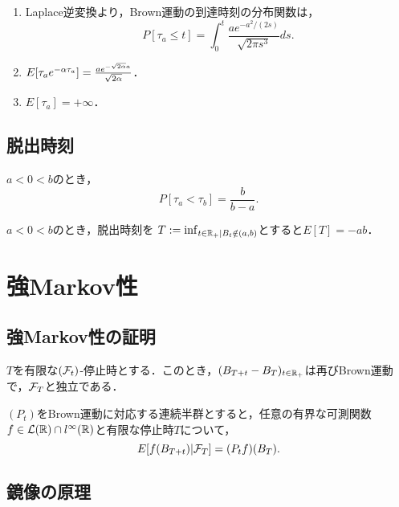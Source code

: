 \documentclass[uplatex,dvipdfmx]{jsreport}
\begin{document}
\begin{corollary}\mbox{}
    \begin{enumerate}
        \item Laplace逆変換より，Brown運動の到達時刻の分布関数は，
        \[P[\tau_a\le t]=\int^t_0\frac{ae^{-a^2/(2s)}}{\sqrt{2\pi s^3}}ds.\]
        \item $E[\tau_ae^{-\alpha\tau_a}]=\frac{ae^{-\sqrt{2\alpha}a}}{\sqrt{2\alpha}}$．
        \item $E[\tau_a]=+\infty$．
    \end{enumerate}
\end{corollary}

\subsection{脱出時刻}

\begin{proposition}
    $a<0<b$のとき，
    \[P[\tau_a<\tau_b]=\frac{b}{b-a}.\]
\end{proposition}

\begin{proposition}
    $a<0<b$のとき，脱出時刻を
    $T:=\inf_{t\in\mathbb{R}_+\mid B_t\notin(a,b)}$とすると$E[T]=-ab$．
\end{proposition}

\section{強Markov性}

\subsection{強Markov性の証明}

\begin{theorem}
    $T$を有限な$(\mathcal{F}_t)$-停止時とする．このとき，$(B_{T+t}-B_T)_{t\in\mathbb{R}_+}$は再びBrown運動で，$\mathcal{F}_T$と独立である．
\end{theorem}

\begin{corollary}
    $(P_t)$をBrown運動に対応する連続半群とすると，任意の有界な可測関数$f\in\mathcal{L}(\mathbb{R})\cap l^\infty(\mathbb{R})$と有限な停止時$T$について，
    \[E[f(B_{T+t})|\mathcal{F}_T]=(P_tf)(B_T).\]
\end{corollary}

\subsection{鏡像の原理}
\end{document}
